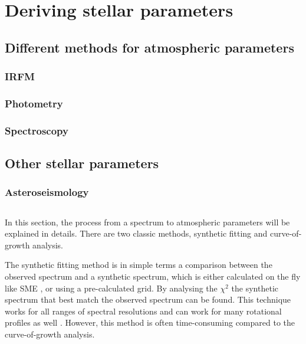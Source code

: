 
\chapter{Deriving stellar parameters}
\label{cha:method}


\section{Different methods for atmospheric parameters}

\subsection{IRFM}

\subsection{Photometry}

\subsection{Spectroscopy}


\section{Other stellar parameters}

\subsection{Asteroseismology}


\section{\FASMA}
\label{sec:parameters}

In this section, the process from a spectrum to atmospheric parameters will be
explained in details. There are two classic methods, synthetic fitting and
curve-of-growth analysis.

The synthetic fitting method is in simple terms a comparison between the
observed spectrum and a synthetic spectrum, which is either calculated on the
fly like SME \citep{Valenti1996}, or using a pre-calculated grid. By analysing
the $\chi^2$ the synthetic spectrum that best match the observed spectrum can be
found. This technique works for all ranges of spectral resolutions and can work
for many rotational profiles as well \citep[see e.g.][]{Tsantaki2017}. However,
this method is often time-consuming compared to the curve-of-growth analysis.

